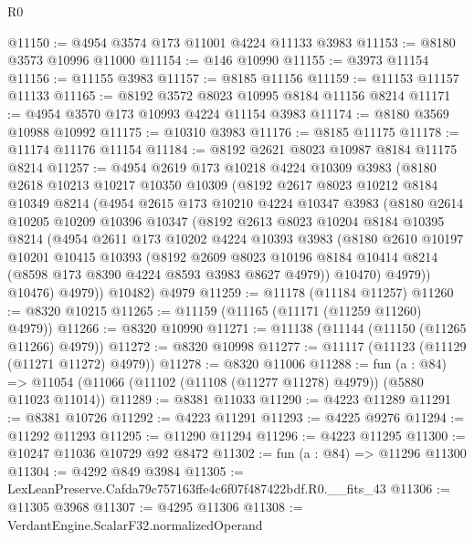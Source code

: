 \begin{lexlean}{R0}
\begin{coremodule}
@11150 := @4954 @3574 @173 @11001 @4224 @11133 @3983
@11153 := @8180 @3573 @10996 @11000
@11154 := @146 @10990
@11155 := @3973 @11154
@11156 := @11155 @3983
@11157 := @8185 @11156
@11159 := @11153 @11157 @11133
@11165 := @8192 @3572 @8023 @10995 @8184 @11156 @8214
@11171 := @4954 @3570 @173 @10993 @4224 @11154 @3983
@11174 := @8180 @3569 @10988 @10992
@11175 := @10310 @3983
@11176 := @8185 @11175
@11178 := @11174 @11176 @11154
@11184 := @8192 @2621 @8023 @10987 @8184 @11175 @8214
@11257 := @4954
    @2619
    @173
    @10218
    @4224
    @10309
    @3983
    (@8180
      @2618
      @10213
      @10217
      @10350
      @10309
      (@8192
        @2617
        @8023
        @10212
        @8184
        @10349
        @8214
        (@4954
          @2615
          @173
          @10210
          @4224
          @10347
          @3983
          (@8180
            @2614
            @10205
            @10209
            @10396
            @10347
            (@8192
              @2613
              @8023
              @10204
              @8184
              @10395
              @8214
              (@4954
                @2611
                @173
                @10202
                @4224
                @10393
                @3983
                (@8180
                  @2610
                  @10197
                  @10201
                  @10415
                  @10393
                  (@8192
                    @2609
                    @8023
                    @10196
                    @8184
                    @10414
                    @8214
                    (@8598 @173 @8390 @4224 @8593 @3983 @8627 @4979))
                  @10470)
                @4979))
            @10476)
          @4979))
      @10482)
    @4979
@11259 := @11178 (@11184 @11257)
@11260 := @8320 @10215
@11265 := @11159 (@11165 (@11171 (@11259 @11260) @4979))
@11266 := @8320 @10990
@11271 := @11138 (@11144 (@11150 (@11265 @11266) @4979))
@11272 := @8320 @10998
@11277 := @11117 (@11123 (@11129 (@11271 @11272) @4979))
@11278 := @8320 @11006
@11288 := fun (a : @84) =>
  @11054 (@11066 (@11102 (@11108 (@11277 @11278) @4979)) (@5880 @11023 @11014))
@11289 := @8381 @11033
@11290 := @4223 @11289
@11291 := @8381 @10726
@11292 := @4223 @11291
@11293 := @4225 @9276
@11294 := @11292 @11293
@11295 := @11290 @11294
@11296 := @4223 @11295
@11300 := @10247 @11036 @10729 @92 @8472
@11302 := fun (a : @84) => @11296 @11300
@11304 := @4292 @849 @3984
@11305 := LexLeanPreserve.Cafda79c757163ffe4c6f07f487422bdf.R0.__fits_43
@11306 := @11305 @3968
@11307 := @4295 @11306
@11308 := VerdantEngine.ScalarF32.normalizedOperand

\end{coremodule}
\end{lexlean}
